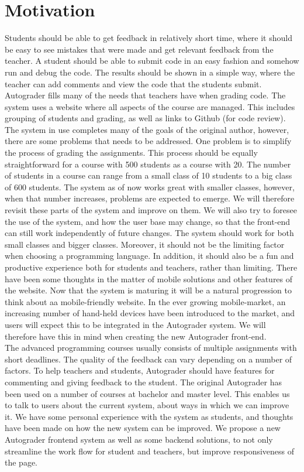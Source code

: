 \chapter*{Motivation}
Students should be able to get feedback in relatively short time, where it should be easy to see mistakes that were made and get relevant feedback from the teacher. A student should be able to submit code in an easy fashion and somehow run and debug the code. The results should be shown in a simple way, where the teacher can add comments and view the code that the students submit. Autograder fills many of the needs that teachers have when grading code. The system uses a website where all aspects of the course are managed. This includes grouping of students and grading, as well as links to Github (for code review). \\The system in use completes many of the goals of the original author, however, there are some problems that needs to be addressed. One problem is to simplify the process of grading the assignments. This process should be equally straightforward for a course with 500 students as a course with 20. The number of students in a course can range from a small class of 10 students to a big class of 600 students. The system as of now works great with smaller classes, however, when that number increases, problems are expected to emerge. We will therefore revisit these parts of the system and improve on them. We will also try to foresee the use of the system, and how the user base may change, so that the front-end can still work independently of future changes. The system should work for both small classes and bigger classes. Moreover, it should not be the limiting factor when choosing a programming language. In addition, it should also be a fun and productive experience both for students and teachers, rather than limiting. There have been some thoughts in the matter of mobile solutions and other features of the website. Now that the system is maturing it will be a natural progression to think about aa mobile-friendly website. In the ever growing mobile-market, an increasing number of hand-held devices have been introduced to the market, and users will expect this to be integrated in the Autograder system. We will therefore have this in mind when creating the new Autograder front-end.\\The advanced programming courses usually consists of multiple assignments with short deadlines. The quality of the feedback can vary depending on a number of factors. To help teachers and students, Autograder should have features for commenting and giving feedback to the student. The original Autograder has been used on a number of courses at bachelor and master level. This enables us to talk to users about the current system, about ways in which we can improve it. We have some personal experience with the system as students, and thoughts have been made on how the new system can be improved. We propose a new Autograder frontend system as well as some backend solutions, to not only streamline the work flow for student and teachers, but improve responsiveness of the page.